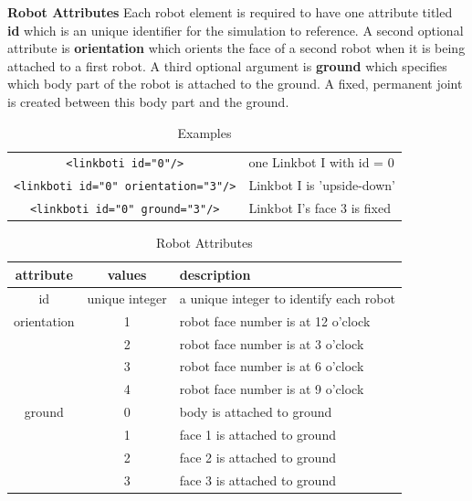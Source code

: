 \documentclass{article}
\begin{document}
\noindent
\newline
\textbf{Robot Attributes}
\newline
Each robot element is required to have one attribute titled \textbf{id} which is
an unique identifier for the simulation to reference.  A second optional
attribute is \textbf{orientation} which orients the face of a second robot when
it is being attached to a first robot.  A third optional argument is
\textbf{ground} which specifies which body part of the robot is attached to the
ground.  A fixed, permanent joint is created between this body part and the
ground.

\begin{table}[H]
	\begin{center}
	\begin{tabular}{c | l}
		\hline \hline
		\verb|<linkboti id="0"/>| & one Linkbot I with id = 0 \\
		\verb|<linkboti id="0" orientation="3"/>| & Linkbot I is 'upside-down' \\
		\verb|<linkboti id="0" ground="3"/>| & Linkbot I's face 3 is fixed \\
		\hline \hline
	\end{tabular}
	\caption{Examples}
	\label{tab:ex}
	\end{center}
\end{table}

\begin{table}[H]
	\begin{center}
	\begin{tabular}{c | c | l}
		\hline \hline
		\textbf{attribute} & \textbf{values} & \textbf{description} \\ \hline
		id & unique integer & a unique integer to identify each robot \\
		orientation & 1 & robot face number is at 12 o'clock \\
		 & 2 & robot face number is at 3 o'clock \\
		 & 3 & robot face number is at 6 o'clock \\
		 & 4 & robot face number is at 9 o'clock \\
		ground & 0 & body is attached to ground \\
		 & 1 & face 1 is attached to ground \\
		 & 2 & face 2 is attached to ground \\
		 & 3 & face 3 is attached to ground \\
		\hline \hline
	\end{tabular}
	\caption{Robot Attributes}
	\label{tab:attributes}
	\end{center}
\end{table}
\end{document}
